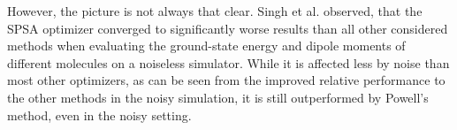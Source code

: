 


However, the picture is not always that clear. Singh et al. \cite{Singh2022} observed, that the \gls{SPSA} optimizer converged to significantly worse results than all other considered methods when evaluating the ground-state energy and dipole moments of different molecules on a noiseless simulator. While it is affected less by noise than most other optimizers, as can be seen from the improved relative performance to the other methods in the noisy simulation, it is still outperformed by Powell's method, even in the noisy setting.

